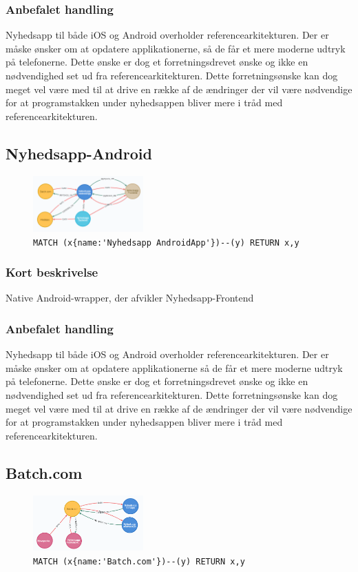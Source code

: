 \documentclass{article}
\begin{document}
\subsubsection*{Anbefalet handling}
Nyhedsapp til både iOS og Android overholder referencearkitekturen. Der er måske ønsker om at opdatere applikationerne, så de får et mere moderne udtryk på telefonerne. Dette ønske er dog et forretningsdrevet ønske og ikke en nødvendighed set ud fra referencearkitekturen. Dette forretningsønske kan dog meget vel være med til at drive en række af de ændringer der vil være nødvendige for at programstakken under nyhedsappen bliver mere i tråd med referencearkitekturen.


\subsection{Nyhedsapp-Android}
\begin{figure}[H]
\includegraphics[width=120pt]{Nyhedsapp-Android.PNG}
\cprotect\caption{\verb|MATCH (x{name:'Nyhedsapp AndroidApp'})--(y) RETURN x,y|}
\end{figure}
\subsubsection*{Kort beskrivelse}
Native Android-wrapper, der afvikler Nyhedsapp-Frontend
\subsubsection*{Anbefalet handling}
Nyhedsapp til både iOS og Android overholder referencearkitekturen. Der er måske ønsker om at opdatere applikationerne så de får et mere moderne udtryk på telefonerne. Dette ønske er dog et forretningsdrevet ønske og ikke en nødvendighed set ud fra referencearkitekturen. Dette forretningsønske kan dog meget vel være med til at drive en række af de ændringer der vil være nødvendige for at programstakken under nyhedsappen bliver mere i tråd med referencearkitekturen.


\subsection{Batch.com}
\begin{figure}[H]
\includegraphics[width=120pt]{Batch-com.PNG}
\cprotect\caption{\verb|MATCH (x{name:'Batch.com'})--(y) RETURN x,y|}
\end{figure}
\end{document}
